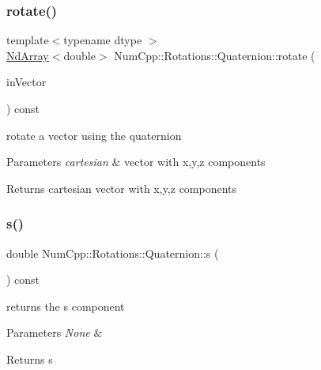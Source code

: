 \subsubsection{\texorpdfstring{rotate()}{rotate()}}
{\footnotesize\ttfamily template$<$typename dtype $>$ \\
\mbox{\hyperlink{class_num_cpp_1_1_nd_array}{Nd\+Array}}$<$double$>$ Num\+Cpp\+::\+Rotations\+::\+Quaternion\+::rotate (\begin{DoxyParamCaption}\item[{const \mbox{\hyperlink{class_num_cpp_1_1_nd_array}{Nd\+Array}}$<$ dtype $>$ \&}]{in\+Vector }\end{DoxyParamCaption}) const\hspace{0.3cm}{\ttfamily [inline]}}

rotate a vector using the quaternion


\begin{DoxyParams}{Parameters}
{\em cartesian} & vector with x,y,z components \\
\hline
\end{DoxyParams}
\begin{DoxyReturn}{Returns}
cartesian vector with x,y,z components 
\end{DoxyReturn}
\mbox{\label{class_num_cpp_1_1_rotations_1_1_quaternion_a9652f86c1fb09a97cb9ef6d31d40e5f9}} 
\subsubsection{\texorpdfstring{s()}{s()}}
{\footnotesize\ttfamily double Num\+Cpp\+::\+Rotations\+::\+Quaternion\+::s (\begin{DoxyParamCaption}{ }\end{DoxyParamCaption}) const\hspace{0.3cm}{\ttfamily [inline]}}

returns the s component


\begin{DoxyParams}{Parameters}
{\em None} & \\
\hline
\end{DoxyParams}
\begin{DoxyReturn}{Returns}
s 
\end{DoxyReturn}
\mbox{\label{class_num_cpp_1_1_rotations_1_1_quaternion_a376b92643574eaecf93ea59540f461ae}} 
